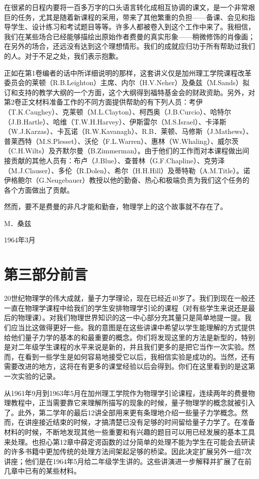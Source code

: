 \documentclass[UTF8, 12pt, a4paper, twoside]{ctexbook}
\begin{document}
在很紧的日程内要将一百多万字的口头语言转化成相互协调的课文，是一个非常艰巨的任务，尤其是随着新课程的采用，带来了其他繁重的负担——备课、会见和指导学生、设计练习和考试题目等等。许多人都被卷入到这个工作中来了。我相信，我们在某些场合已经能够描绘出原始作者费曼的真实形象——稍微修饰的肖像画；在另外的场合，还远没有达到这个理想情形。我们的成就应归功于所有帮助过我们的人。对于不足之处，我们表示抱歉。

正如在第1卷编者的话中所详细说明的那样，这套讲义仅是加州理工学院课程改革委员会的莱顿（R.B.Leighton）主席、内尔（H.V.Neher）及桑兹（M.Sands）拟订和支持的教学大纲的一个方面，这个大纲得到福特基金会的财政资助。另外，对第2卷正文材料准备工作的不同方面提供帮助的有下列人员：考伊（T.K.Caughey）、克莱顿（M.L.Clayton）、柯西奥（J.B.Curcio）、哈特尔（J.B.Hartle）、哈维（T.W.H.Harvey）、伊斯雷尔（M.S.Israel）、卡泽斯（W.J.Karzas）、卡瓦诺（R.W.Kavanagh）、R.B．莱顿、马修斯（J.Mathews）、普莱西特（M.S.Plesset）、沃伦（F.L.Warren）、惠林（W.Whaling）、威尔茨（C.H.Wilts）及齐默尔曼（B.Zimmerman）。由于他们的工作而对本课程做出间接贡献的其他人员有：布卢（J.Blue）、查普林（G.F.Chapline）、克劳泽（M.J.Clauser）、多伦（R.Dolen）、希尔（H.H.Hill）及蒂特勒（A.M.Title）。诺伊格鲍尔（G.Neugebauer）教授以他的勤奋、热心和极端负责为我们这个任务的各个方面做出了贡献。

然而，要不是费曼的非凡才能和勤奋，物理学上的这个故事就不存在了。

\hfill M．桑兹

\hfill 1964年3月

\section*{第三部分前言}

20世纪物理学的伟大成就，量子力学理论，现在已经近40岁了。我们到现在一般还一直在物理学课程中给我们的学生安排物理学引论的课程（对有些学生来说还是最后的物理课）。对我们物理世界知识的这一中心部分充其量只是简单地提一提。我们应当比这做得更好一些。我的意图是在这些讲课中希望以学生能理解的方式提供给他们量子力学的基本的和最重要的概念。你们将发现这里的方法是新型的，特别是对二年级学生课程的水平来说是新的，并且我们更多的是把它当作一次实验。然而，在看到一些学生是如何容易地接受它以后，我相信实验是成功的。当然，还有需要改进的地方，这将在有更多的课堂经验以后会得到。你们在这里看到的是这第一次实验的记录。

从1961年9月到1963年5月在加州理工学院作为物理学引论课程，连续两年的费曼物理教程中，正当需要靠它来理解所描写的现象的时候，量子物理学的概念就被引入了。此外，第二学年的最后12讲全部用来更有条理地介绍一些量子力学概念。然而，在讲座接近结束的时候，才搞清楚已没有足够的时间留给量子力学了。在准备材料的时候，不断地发现其他一些重要和有兴趣的题目可以用已经发展的基本工具来处理。也担心第12章中薛定谔函数的过分简单的处理不能为学生在可能会去研读的许多书籍中更加传统的处理方法间架起足够的桥梁。因此决定扩展另外一组7次讲座；他们是在1964年5月给二年级学生讲的。这些讲演进一步解释并扩展了在前几章中已有的某些材料。
\end{document}
